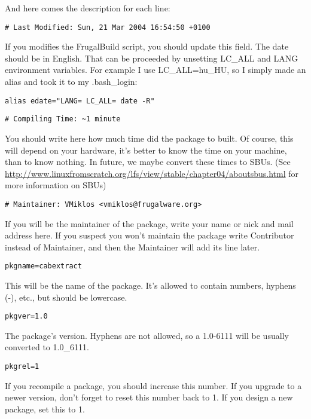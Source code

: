And here comes the description for each line:
\begin{verbatim}
# Last Modified: Sun, 21 Mar 2004 16:54:50 +0100
\end{verbatim}

If you modifies the FrugalBuild script, you should update this field. The date should be in English. That can be proceeded by unsetting LC\_ALL and LANG environment variables. For example I use LC\_ALL=hu\_HU, so I simply made an alias and took it to my .bash\_login:
\begin{verbatim}
alias edate="LANG= LC_ALL= date -R"
\end{verbatim}
\begin{verbatim}
# Compiling Time: ~1 minute
\end{verbatim}

You should write here how much time did the package to built. Of course, this will depend on your hardware, it's better to know the time on your machine, than to know nothing. In future, we maybe convert these times to SBUs. (See \url{http://www.linuxfromscratch.org/lfs/view/stable/chapter04/aboutsbus.html} for more information on SBUs)

\begin{verbatim}
# Maintainer: VMiklos <vmiklos@frugalware.org>
\end{verbatim}

If you will be the maintainer of the package, write your name or nick and mail address here. If you suspect you won't maintain the package write Contributor instead of Maintainer, and then the Maintainer will add its line later.

\begin{verbatim}
pkgname=cabextract
\end{verbatim}

This will be the name of the package. It's allowed to contain numbers, hyphens (-), etc., but should be lowercase.

\begin{verbatim}
pkgver=1.0
\end{verbatim}

The package's version. Hyphens are not allowed, so a 1.0-6111 will be usually converted to 1.0\_6111.

\begin{verbatim}
pkgrel=1
\end{verbatim}

If you recompile a package, you should increase this number. If you upgrade to a newer version, don't forget to reset this number back to 1. If you design a new package, set this to 1.

